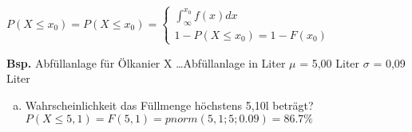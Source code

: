 \begin{math}
    P (X \leq x_{0}) = P (X \le x_{0}) = \begin{cases}
        \int_{\infty}^{x_{0}} f(x) dx \\
        1 - P(X \leq x_{0}) = 1 - F(x_{0})
    \end{cases}
\end{math}

\textbf{Bsp.} Abf\"ullanlage f\"ur \"Olkanier X \ldots Abf\"ullanlage in Liter $\mu$ =
5,00 Liter $\sigma$ = 0,09 Liter
\begin{enumerate}[(a)]
    \item Wahrscheinlichkeit das F\"ullmenge h\"ochstens 5,10l betr\"agt? \newline $P ( X
              \leq 5,1) = F(5,1) = pnorm(5,1 ; 5 ; 0.09) = 86.7\%$
\end{enumerate}